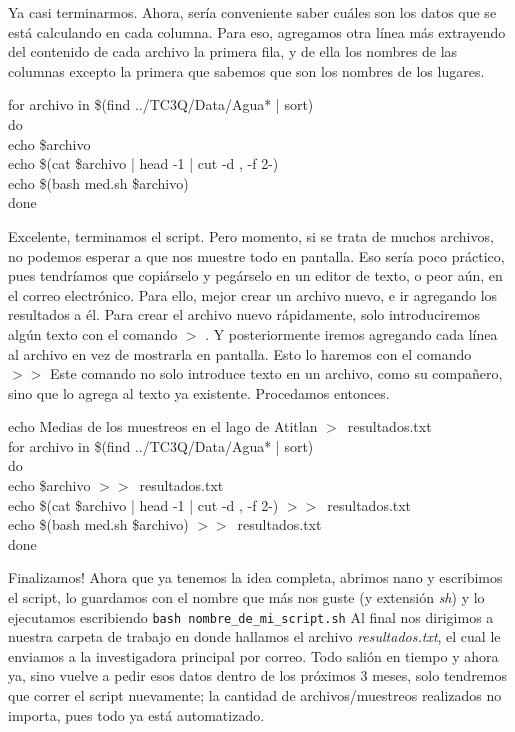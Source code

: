 \documentclass[10pt,letterpaper]{article}
\newcommand{\inlinecode}[1]{
\colorbox{light-gray}{\texttt{#1}}
}
\newenvironment{Code}
{
\begin{lrbox}{\selvestebox}%
\begin{minipage}{\dimexpr\columnwidth-2\fboxsep\relax}
\fontfamily{\ttdefault}\selectfont
}
{\end{minipage}\end{lrbox}%
\begin{center}
\colorbox{light-gray}{\usebox{\selvestebox}}
\end{center}
}
\begin{document}
Ya casi terminarmos. Ahora, ser\'ia conveniente saber cu\'ales son los datos que se est\'a calculando en cada columna. Para eso, agregamos otra l\'inea m\'as extrayendo del contenido de cada archivo la primera fila, y de ella los nombres de las columnas excepto la primera que sabemos que son los nombres de los lugares.

\begin{Code}
for archivo in \$(find ../TC3Q/Data/Agua* | sort)\\
do\\
echo \$archivo\\
echo \$(cat \$archivo | head -1 | cut -d , -f 2-)\\
echo \$(bash med.sh \$archivo)\\
done
\end{Code}

Excelente, terminamos el script. Pero momento, si se trata de muchos archivos, no podemos esperar a que nos muestre todo en pantalla. Eso ser\'ia poco pr\'actico, pues tendr\'iamos que copi\'arselo y peg\'arselo en un editor de texto, o peor a\'un, en el correo electr\'onico. Para ello, mejor crear un archivo nuevo, e ir agregando los resultados a \'el. Para crear el archivo nuevo r\'apidamente, solo introduciremos alg\'un texto con el comando \inlinecode{$>$}. Y posteriormente iremos agregando cada l\'inea al archivo en vez de mostrarla en pantalla. Esto lo haremos con el comando \inlinecode{$>>$} Este comando no solo introduce texto en un archivo, como su compa\~nero, sino que lo agrega al texto ya existente. Procedamos entonces.

\begin{Code}
echo Medias de los muestreos en el lago de Atitlan $>$\ resultados.txt\\
for archivo in \$(find ../TC3Q/Data/Agua* | sort)\\
do\\
echo \$archivo $>>$\ resultados.txt\\
echo \$(cat \$archivo | head -1 | cut -d , -f 2-) $>>$\ resultados.txt\\
echo \$(bash med.sh \$archivo) $>>$\ resultados.txt\\
done
\end{Code}

Finalizamos! Ahora que ya tenemos la idea completa, abrimos nano y escribimos el script, lo guardamos con el nombre que m\'as nos guste (y extensi\'on \emph{sh}) y lo ejecutamos escribiendo \inlinecode{bash nombre\_de\_mi\_script.sh} Al final nos dirigimos a nuestra carpeta de trabajo en donde hallamos el archivo \emph{resultados.txt}, el cual le enviamos a la investigadora principal por correo. Todo sali\'on en tiempo y ahora ya, sino vuelve a pedir esos datos dentro de los pr\'oximos 3 meses, solo tendremos que correr el script nuevamente; la cantidad de archivos/muestreos realizados no importa, pues todo ya est\'a automatizado.
\end{document}
